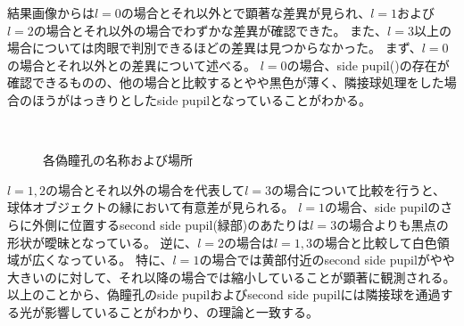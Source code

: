 \newpage
結果画像からは$l = 0$の場合とそれ以外とで顕著な差異が見られ、$l = 1$および$l = 2$の場合とそれ以外の場合でわずかな差異が確認できた。
また、$l = 3$以上の場合については肉眼で判別できるほどの差異は見つからなかった。
まず、$l = 0$の場合とそれ以外との差異について述べる。
$l = 0$の場合、side pupil()の存在が確認できるものの、他の場合と比較するとやや黒色が薄く、隣接球処理をした場合のほうがはっきりとしたside pupilとなっていることがわかる。
\begin{figure}[htbp]
  \centering
{}\\
  \caption{各偽瞳孔の名称および場所}
  \label{FPseudopupilName}
\end{figure}
$l = 1,2$の場合とそれ以外の場合を代表して$l = 3$の場合について比較を行うと、球体オブジェクトの縁において有意差が見られる。
$l = 1$の場合、side pupilのさらに外側に位置するsecond side pupil(緑部)のあたりは$l = 3$の場合よりも黒点の形状が曖昧となっている。
逆に、$l = 2$の場合は$l = 1,3$の場合と比較して白色領域が広くなっている。
特に、$l = 1$の場合では黄部付近のsecond side pupilがやや大きいのに対して、それ以降の場合では縮小していることが顕著に観測される。
以上のことから、偽瞳孔のside pupilおよびsecond side pupilには隣接球を通過する光が影響していることがわかり、の理論と一致する。

